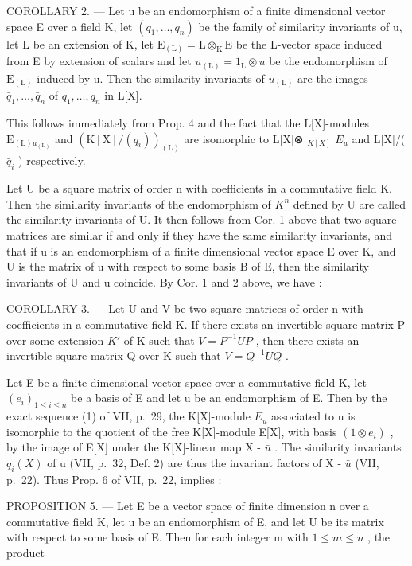 COROLLARY 2. --- Let u be an endomorphism of a finite dimensional vector space E over a field K, let \((q_{1}, \ldots, q_{n})\) be the family of similarity invariants of u, let L be an extension of K, let \(\mathrm{E}_{(\mathrm{L})} = \mathrm{L} \otimes_{\mathrm{K}} \mathrm{E}\) be the L-vector space induced from E by extension of scalars and let \(u_{(\mathrm{L})} = 1_{\mathrm{L}} \otimes u\) be the endomorphism of \(\mathrm{E}_{(\mathrm{L})}\) induced by u. Then the similarity invariants of \(u_{(\mathrm{L})}\) are the images \(\bar{q}_{1}, \ldots, \bar{q}_{n}\) of \(q_{1}, \ldots, q_{n}\) in L{[}X{]}.

This follows immediately from Prop. 4 and the fact that the L{[}X{]}-modules \(\mathrm{E}_{(\mathrm{L})u_{(\mathrm{L})}}\) and \((\mathrm{K}[\mathrm{X}]/(q_{i}))_{(\mathrm{L})}\) are isomorphic to L{[}X{]}⊗ \(_{K[X]}\) \(E_{u}\) and L{[}X{]}/( \(\bar{q}_{i}\) ) respectively.

Let U be a square matrix of order n with coefficients in a commutative field K. Then the similarity invariants of the endomorphism of \(K^{n}\) defined by U are called the similarity invariants of U. It then follows from Cor. 1 above that two square matrices are similar if and only if they have the same similarity invariants, and that if u is an endomorphism of a finite dimensional vector space E over K, and U is the matrix of u with respect to some basis B of E, then the similarity invariants of U and u coincide. By Cor. 1 and 2 above, we have :

COROLLARY 3. --- Let U and V be two square matrices of order n with coefficients in a commutative field K. If there exists an invertible square matrix P over some extension \(K'\) of K such that \(V = P^{-1}UP\) , then there exists an invertible square matrix Q over K such that \(V = Q^{-1}UQ\) .

Let E be a finite dimensional vector space over a commutative field K, let \((e_{i})_{1 \leq i \leq n}\) be a basis of E and let u be an endomorphism of E. Then by the exact sequence (1) of VII, p.~29, the K{[}X{]}-module \(E_{u}\) associated to u is isomorphic to the quotient of the free K{[}X{]}-module E{[}X{]}, with basis \((1 \otimes e_{i})\) , by the image of E{[}X{]} under the K{[}X{]}-linear map X - \(\bar{u}\) . The similarity invariants \(q_{i}(X)\) of u (VII, p.~32, Def. 2) are thus the invariant factors of X - \(\bar{u}\) (VII, p.~22). Thus Prop. 6 of VII, p.~22, implies :

PROPOSITION 5. --- Let E be a vector space of finite dimension n over a commutative field K, let u be an endomorphism of E, and let U be its matrix with respect to some basis of E. Then for each integer m with \(1 \leq m \leq n\) , the product

